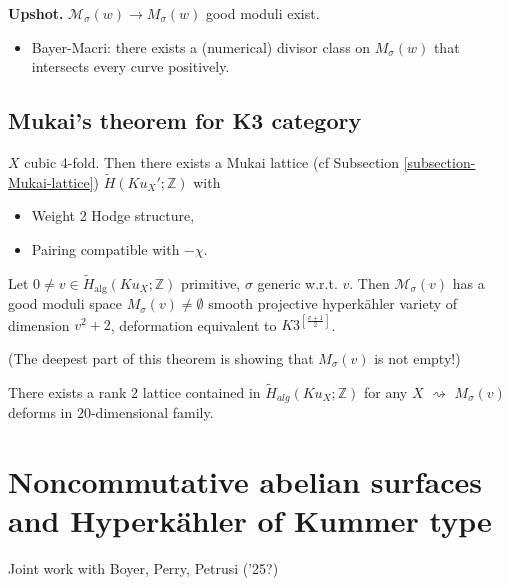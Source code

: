 \medskip\noindent
{\bf Upshot.} $\mathcal{M}_{\sigma}(w) \to M_{\sigma}(w)$ good moduli exist.

\begin{itemize}
\item Bayer-Macri: there exists a (numerical) divisor class on $M_{\sigma}(w)$
that intersects every curve positively.
\end{itemize}

\subsection{Mukai's theorem for K3 category}
\label{subsection-Mukais-theorem-for-K3-category}

\begin{proposition}
\label{proposition-4-fold-Mukai-lattice}
$X$ cubic 4-fold. Then there exists a Mukai lattice (cf Subsection
\ref{subsection-Mukai-lattice}) $\tilde{H}(Ku_X';\mathbb{Z})$ with
\begin{itemize}
\item Weight 2 Hodge structure,
\item Pairing compatible with $-\chi$.
\end{itemize}
\end{proposition}

\begin{theorem}[BLMNPS]
\label{theorem-BLMNPS}
Let $0 \neq  v \in \tilde{H}_{\text{alg}}(Ku_X;\mathbb{Z})$ primitive, $\sigma$
generic w.r.t. $v$. Then $\mathcal{M}_{\sigma}(v)$ has a good moduli space
$M_{\sigma}(v)\neq \emptyset$ 
smooth projective hyperkähler variety of dimension $v^2+2$,
deformation equivalent to $K3^{\left[ \frac{v+1}{2 } \right] }$.
\end{theorem}

(The deepest part of this theorem is showing that
$M_{\sigma}(v)$ is not empty!)

\medskip\noindent
There exists a rank 2 lattice contained in $\tilde{H}_{alg}(Ku_X;\mathbb{Z})$
for any $X$ $\rightsquigarrow $ $M_\sigma(v)$ deforms in $20$-dimensional
family.

\section{Noncommutative abelian surfaces and Hyperkähler of Kummer type}
\label{section-noncommutative-abelian-surfaces-and-HK-of-Kummer-type}

Joint work with Boyer, Perry, Petrusi ('25?)

